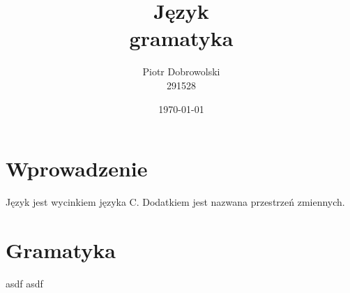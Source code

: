 \documentclass[a4paper,10pt]{article}
\title{Język \kappa \\gramatyka}
\author{Piotr Dobrowolski \\ \small{291528}}
\date{\today}
\begin{document}
\maketitle

\section{Wprowadzenie}
Język jest wycinkiem języka C.
Dodatkiem jest nazwana przestrzeń zmiennych.
\section{Gramatyka}
asdf \rightarrow asdf
\end{document}
